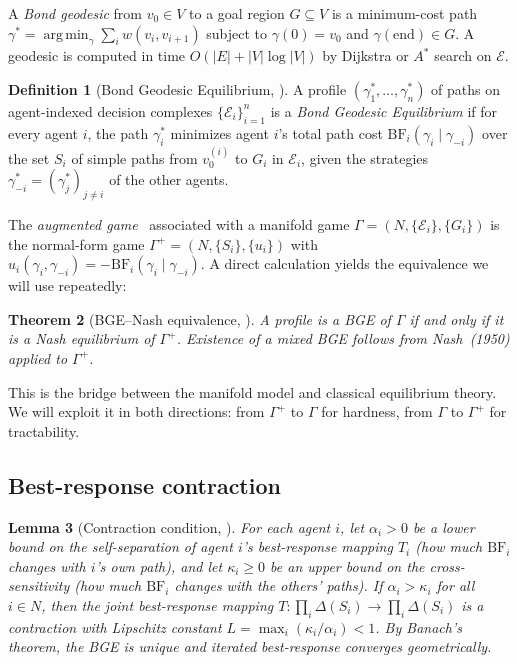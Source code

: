 \documentclass[11pt]{article}
\newtheorem{theorem}{Theorem}[section]
\newtheorem{lemma}[theorem]{Lemma}
\theoremstyle{definition}
\newtheorem{definition}[theorem]{Definition}
\theoremstyle{remark}
\newcommand{\E}{\mathcal{E}}
\newcommand{\BF}{\mathrm{BF}}
\DeclareMathOperator*{\argmin}{arg\,min}
\begin{document}
A \emph{Bond geodesic} from $v_0 \in V$ to a goal region $G \subseteq V$ is a minimum-cost path
$\gamma^* = \argmin_\gamma \sum_{i} w(v_i, v_{i+1})$ subject to $\gamma(0) = v_0$ and
$\gamma(\mathrm{end}) \in G$. A geodesic is computed in time $O(|E| + |V|\log|V|)$ by Dijkstra
or $A^*$ search on $\E$.

\begin{definition}[Bond Geodesic Equilibrium, \cite{bond2026geometric}]
\label{def:bge}
A profile $(\gamma_1^*, \ldots, \gamma_n^*)$ of paths on agent-indexed decision complexes
$\{\E_i\}_{i=1}^n$ is a \emph{Bond Geodesic Equilibrium} if for every agent $i$, the path
$\gamma_i^*$ minimizes agent $i$'s total path cost
$\BF_i(\gamma_i \mid \gamma_{-i})$ over the set $S_i$ of simple paths from $v_0^{(i)}$ to $G_i$ in
$\E_i$, given the strategies $\gamma_{-i}^* = (\gamma_j^*)_{j \neq i}$ of the other agents.
\end{definition}

The \emph{augmented game}~\cite[Definition~20]{bond2026geometric} associated with a manifold game
$\Gamma = (N, \{\E_i\}, \{G_i\})$ is the normal-form game $\Gamma^+ = (N, \{S_i\}, \{u_i\})$ with
$u_i(\gamma_i, \gamma_{-i}) = -\BF_i(\gamma_i \mid \gamma_{-i})$. A direct calculation
\cite[Theorem~21]{bond2026geometric} yields the equivalence we will use repeatedly:

\begin{theorem}[BGE--Nash equivalence, \cite{bond2026geometric}]
\label{thm:equivalence}
A profile is a BGE of $\Gamma$ if and only if it is a Nash equilibrium of $\Gamma^+$. Existence of a
mixed BGE follows from Nash~(1950) applied to $\Gamma^+$.
\end{theorem}

This is the bridge between the manifold model and classical equilibrium theory. We will exploit it in
both directions: from $\Gamma^+$ to $\Gamma$ for hardness, from $\Gamma$ to $\Gamma^+$ for tractability.

\subsection{Best-response contraction}

\begin{lemma}[Contraction condition, \cite{bond2026geometric}]
\label{lem:contraction}
For each agent $i$, let $\alpha_i > 0$ be a lower bound on the self-separation of agent $i$'s
best-response mapping $T_i$ (how much $\BF_i$ changes with $i$'s own path), and let
$\kappa_i \geq 0$ be an upper bound on the cross-sensitivity (how much $\BF_i$ changes with the
others' paths). If $\alpha_i > \kappa_i$ for all $i \in N$, then the joint best-response
mapping $T : \prod_i \Delta(S_i) \to \prod_i \Delta(S_i)$ is a contraction with Lipschitz constant
$L = \max_i (\kappa_i/\alpha_i) < 1$. By Banach's theorem, the BGE is unique and iterated
best-response converges geometrically.
\end{lemma}
\end{document}
